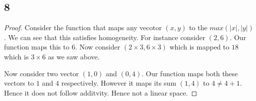 \documentclass[a4paper]{report}
\begin{document}
\subsection*{8}
\begin{proof}
    Consider the function that maps any vecotor $(x,y)$ to the $max(|x|,|y|)$. We can see that this satisfies homogeneity. For instance consider  $(2,6)$. Our function maps this to  $6$. Now consider  $(2 \times 3, 6 \times 3)$  which is mapped to $18$ which is  $3 \times  6$ as we saw above. 

    Now consider two vector $(1,0)$ and  $(0,4)$. Our function maps both these vectors to  $1$ and $4$ respectively. However it maps its sum  $(1,4)$ to  $4 \ne 4 + 1$. Hence it does not follow additvity. Hence not a linear space.
\end{proof}
\end{document}
